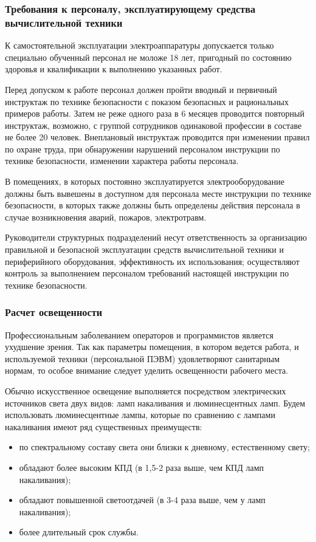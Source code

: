 \subsubsection{Требования к персоналу, эксплуатирующему средства вычислительной техники}

К самостоятельной эксплуатации электроаппаратуры допускается только специально обученный персонал не моложе 18 лет, пригодный по состоянию здоровья и квалификации к выполнению указанных работ.

Перед допуском к работе персонал должен пройти вводный и первичный инструктаж по технике безопасности с показом безопасных и рациональных примеров работы. Затем не реже одного раза в 6 месяцев проводится повторный инструктаж, возможно, с группой сотрудников одинаковой профессии в составе не более 20 человек. Внеплановый инструктаж проводится при изменении правил по охране труда, при обнаружении нарушений персоналом инструкции по технике безопасности, изменении характера работы персонала.

В помещениях, в которых постоянно эксплуатируется электрооборудование должны быть вывешены в доступном для персонала месте инструкции по технике безопасности, в которых также должны быть определены действия персонала в случае возникновения аварий, пожаров, электротравм.

Руководители структурных подразделений несут ответственность за организацию правильной и безопасной эксплуатации средств вычислительной техники и периферийного оборудования, эффективность их использования; осуществляют контроль за выполнением персоналом требований настоящей инструкции по технике безопасности.

\subsubsection{Расчет освещенности}

Профессиональным заболеванием операторов и программистов является ухудшение зрения.
Так как параметры помещения, в котором ведется работа, и используемой техники (персональной ПЭВМ) удовлетворяют санитарным нормам, то особое внимание следует уделить освещенности рабочего места.

Обычно искусственное освещение выполняется посредством электрических источников света двух видов: ламп накаливания и люминесцентных ламп. Будем использовать люминесцентные лампы, которые по сравнению с лампами накаливания имеют ряд существенных преимуществ:
\begin{itemize}
\item по спектральному составу света они близки к дневному, естественному свету;
\item обладают более высоким КПД (в 1,5-2 раза выше, чем КПД ламп накаливания);
\item обладают повышенной светоотдачей (в 3-4 раза выше, чем у ламп накаливания);
\item более длительный срок службы.
\end{itemize}

